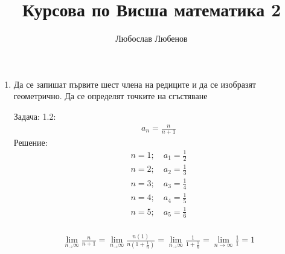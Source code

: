 \documentclass[a4paper, 20pt, fleqn, border=2pt]{article}
\title{Курсова по Висша математика 2}
\author{Любослав Любенов}
\begin{document}
\maketitle
\par
 
\begin{enumerate}
    \item Да се запишат първите шест члена на редиците и да се изобразят геометрично. Да се определят точките на сгъстяване
\par
\par

Задача: 1.2:
\begin{equation}
\begin{split}
    a_n = \frac{n}{n+1}
\end{split}
\end{equation}
Решение:
\begin{equation}
\begin{split}
    n = 1;\quad a_1 = \frac{1}{2} \\ 
    n = 2;\quad a_2 = \frac{1}{3} \\ 
    n = 3;\quad a_3 = \frac{1}{4} \\ 
    n = 4;\quad a_4 = \frac{1}{5} \\ 
    n = 5;\quad a_5 = \frac{1}{6} \\
\end{split}
\end{equation}


\par

\begin{equation}
\begin{split}
    \lim_{n_\to\infty}\frac{n}{n+1} = \lim_{n_\to\infty}\frac{n(1)}{n(1+\frac{1}{n})} = \lim_{n_\to\infty}\frac{1}{1+\frac{1}{n}} = \lim_{n\to\infty}\frac{1}{1} = 1 \\
\end{split}
\end{equation}


\end{enumerate}
\end{document}
